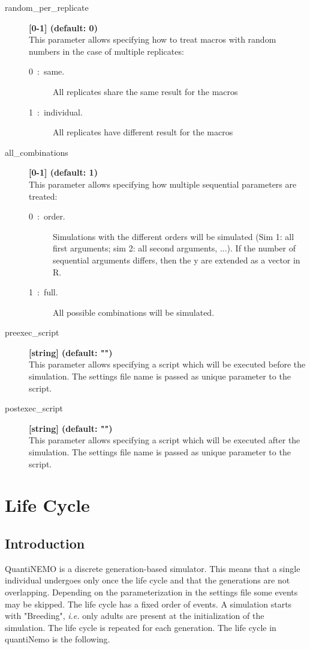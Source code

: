 \documentclass[letterpaper,12pt,oneside]{book}
\begin{document}
\begin{description}
\item[random\_per\_replicate] \textbf{[0-1] (default: 0)}\\
This parameter allows specifying how to treat macros with random numbers in the case of multiple replicates:
\begin{description}
	\item[0~:~same.] All replicates share the same result for the macros
	\item[1~:~individual.] All replicates have different result for the macros
\end{description}

\item[all\_combinations] \textbf{[0-1] (default: 1)}\\
This parameter allows specifying how multiple sequential parameters are treated:
\begin{description}
	\item[0~:~order.] Simulations with the different orders will be simulated (Sim 1: all first arguments; sim 2: all second arguments, ...). If the number of sequential arguments differs, then the y are extended as a vector in R.
	\item[1~:~full.] All possible combinations will be simulated. 
\end{description}

\item[preexec\_script] \textbf{[string] (default: "")}\\
This parameter allows specifying a script which will be executed before the simulation. The settings file name is passed as unique parameter to the script.

\item[postexec\_script] \textbf{[string] (default: "")}\\
This parameter allows specifying a script which will be executed after the simulation. The settings file name is passed as unique parameter to the script.
\end{description}


\newpage
\chapter{Life Cycle}\label{chap:LifeCycle}
\section{Introduction}
QuantiNEMO is a discrete generation-based simulator. This means that a single individual undergoes only once the life cycle and that the generations are not overlapping. Depending on the parameterization in the settings file some events may be skipped. The life cycle has a fixed order of events. A simulation starts with "Breeding", \textit{i.e.} only adults are present at the initialization of the simulation. The life cycle is repeated for each generation. The life cycle in quantiNemo is the following.  
\end{document}
